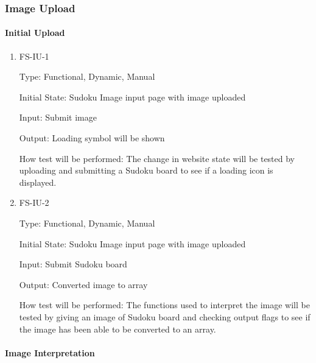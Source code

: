 \documentclass[11pt]{article}
\begin{document}
\subsubsection{Image Upload}

\paragraph{Initial Upload}

\begin{enumerate}

\item{FS-IU-1\\}

Type: Functional, Dynamic, Manual
					
Initial State: Sudoku Image input page with image uploaded
					
Input: Submit image
					
Output: Loading symbol will be shown
					
How test will be performed: The change in website state will be tested by uploading and submitting a Sudoku board to see if a loading icon is displayed.
					
\item{FS-IU-2\\}

Type: Functional, Dynamic, Manual
					
Initial State: Sudoku Image input page with image uploaded
					
Input: Submit Sudoku board
					
Output: Converted image to array
					
How test will be performed: The functions used to interpret the image will be tested by giving an image of Sudoku board and checking output flags to see if the image has been able to be converted to an array.

\end{enumerate}

\paragraph{Image Interpretation}
\end{document}
